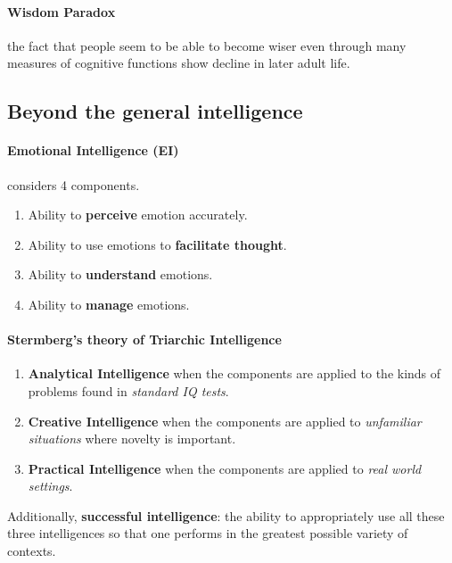 \documentclass{article}
\begin{document}
	\paragraph{Wisdom Paradox} the fact that people seem to be able to become wiser even through many measures of cognitive functions show decline in later adult life.
	\subsection{Beyond the general intelligence}
	\paragraph{Emotional Intelligence (EI)} considers 4 components.
	\begin{enumerate}
		\item Ability to \textbf{perceive} emotion accurately.
		\item Ability to use emotions to \textbf{facilitate thought}.
		\item Ability to \textbf{understand} emotions.
		\item Ability to \textbf{manage} emotions.
	\end{enumerate}
	\paragraph{Stermberg's theory of Triarchic Intelligence}
	\begin{enumerate}
		\item \textbf{Analytical Intelligence} when the components are applied to the kinds of problems found in \emph{standard IQ tests}.
		\item \textbf{Creative Intelligence} when the components are applied to \emph{unfamiliar situations} where novelty is important.
		\item \textbf{Practical Intelligence} when the components are applied to \emph{real world settings}.
	\end{enumerate}
	
	Additionally, \textbf{successful intelligence}: the ability to appropriately use all these three intelligences so that one performs in the greatest possible variety of contexts.
\end{document}
